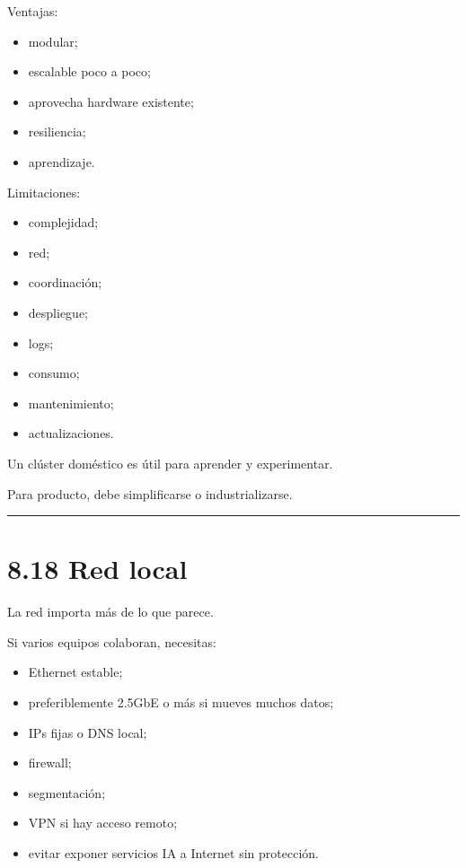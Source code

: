 Ventajas:

\begin{itemize}
\tightlist
\item
  modular;
\item
  escalable poco a poco;
\item
  aprovecha hardware existente;
\item
  resiliencia;
\item
  aprendizaje.
\end{itemize}

Limitaciones:

\begin{itemize}
\tightlist
\item
  complejidad;
\item
  red;
\item
  coordinación;
\item
  despliegue;
\item
  logs;
\item
  consumo;
\item
  mantenimiento;
\item
  actualizaciones.
\end{itemize}

Un clúster doméstico es útil para aprender y experimentar.

Para producto, debe simplificarse o industrializarse.

\begin{center}\rule{0.5\linewidth}{0.5pt}\end{center}

\section{8.18 Red local}\label{red-local}

La red importa más de lo que parece.

Si varios equipos colaboran, necesitas:

\begin{itemize}
\tightlist
\item
  Ethernet estable;
\item
  preferiblemente 2.5GbE o más si mueves muchos datos;
\item
  IPs fijas o DNS local;
\item
  firewall;
\item
  segmentación;
\item
  VPN si hay acceso remoto;
\item
  evitar exponer servicios IA a Internet sin protección.
\end{itemize}

